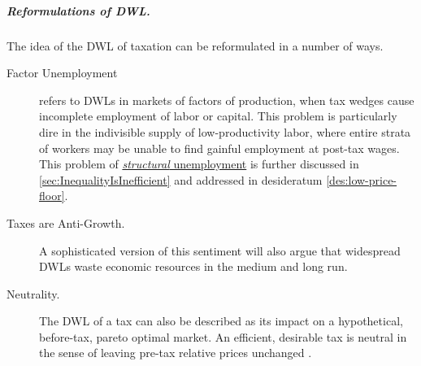 \subparagraph{Reformulations of DWL.}
The idea of the DWL of taxation can be reformulated in a number of ways.
\begin{description}
	\item[Factor Unemployment]
	refers to DWLs in markets of factors of production, when tax wedges cause incomplete employment of labor or capital.
	This problem is particularly dire in the indivisible supply of low-productivity labor, where entire strata of workers may be unable to find gainful employment at post-tax wages.
	This problem of \hyperref[sec:StructuralUnemployment]{\emph{structural} unemployment} is further discussed in \autoref{sec:InequalityIsInefficient} and addressed in desideratum \ref{des:low-price-floor}.

	\item[Taxes are Anti-Growth.]
	A sophisticated version of this sentiment will also argue that widespread DWLs waste economic resources in the medium and long run.

	\item[Neutrality.]
	The DWL of a tax can also be described as its impact on a hypothetical, before-tax, pareto optimal market.
	An efficient, desirable tax is neutral in the sense of leaving pre-tax relative prices unchanged \citep[849]{McCaffery2005}.
\end{description}




